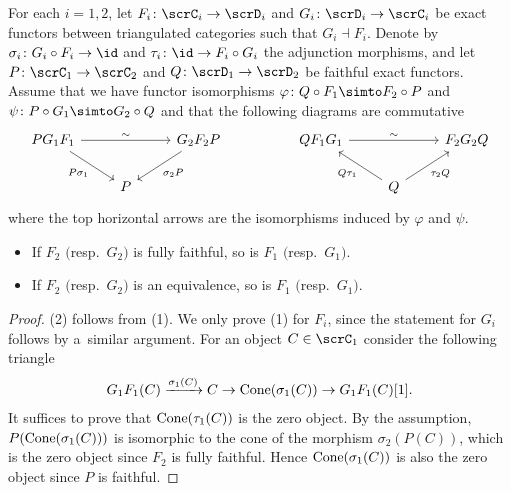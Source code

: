 \begin{lem}\label{reduction lemma}
For each $i=1,2$, let $F_i\colon \scrC_i\to \scrD_i$ and $G_i\colon \scrD_i\to \scrC_i$ be exact functors between triangulated categories such that $G_i\dashv F_i$. Denote by $\sigma_i\colon G_i\circ F_i\to \id$ and $\tau_i\colon \id\to F_i\circ G_i$ the adjunction morphisms, and let $P\colon \scrC_1\to \scrC_2$ and $Q\colon \scrD_1\to\scrD_2$ be faithful exact functors. Assume that we have functor isomorphisms $\varphi\colon Q\circ F_1\simto F_2\circ P$ and $\psi\colon P\circ G_1\simto G_2\circ Q$ and that the following diagrams are commutative
\[
\begin{tikzcd}
PG_1F_1\arrow[rr, "\sim"]\arrow[rd, "P\sigma_1"']&&G_2F_2P\arrow[ld, "\sigma_2P"]&&
QF_1G_1\arrow[rr, "\sim"]&&F_2G_2Q\\
&P&&&&Q\arrow[lu, "Q\tau_1"]\arrow[ru, "\tau_2Q"']&
\end{tikzcd}
\]
where the top horizontal arrows are the isomorphisms induced by $\varphi$ and $\psi$.
\begin{itemize}\itemsep=0pt
\item[$1.$] If $F_2$ $($resp.\ $G_2)$ is fully faithful, so is $F_1$ $($resp.\ $G_1)$.
\item[$2.$] If $F_2$ $($resp.\ $G_2)$ is an equivalence, so is $F_1$ $($resp.\ $G_1)$.
\end{itemize}
\begin{proof}
(2) follows from (1). We only prove (1) for $F_i$, since the statement for $G_i$ follows by a~simi\-lar argument. For an object $C\in \scrC_1$ consider the following triangle
\begin{gather*}
 G_1F_1(C)\xrightarrow{\sigma_1(C)} C\to{\rm Cone}(\sigma_1(C))\to G_1F_1(C)[1].
\end{gather*}
It suffices to prove that ${\rm Cone}(\tau_1(C))$ is the zero object. By the assumption, $P({\rm Cone}(\sigma_1(C)))$ is isomorphic to the cone of the morphism $\sigma_2(P(C))$, which is the zero object since $F_2$ is fully faithful. Hence ${\rm Cone}(\sigma_1(C))$ is also the zero object since $P$ is faithful.
\end{proof}
\end{lem}





